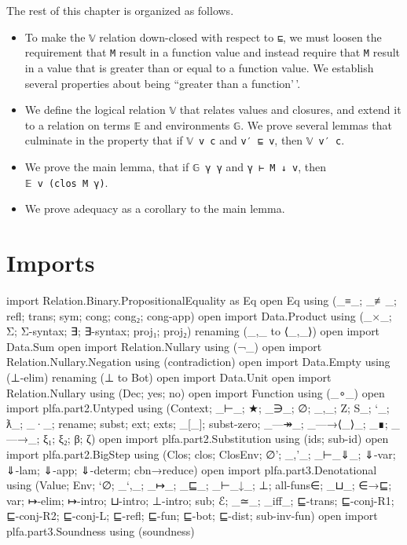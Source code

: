 The rest of this chapter is organized as follows.

\begin{itemize}
\item
  To make the \texttt{𝕍} relation down-closed with respect to
  \texttt{⊑}, we must loosen the requirement that \texttt{M} result in a
  function value and instead require that \texttt{M} result in a value
  that is greater than or equal to a function value. We establish
  several properties about being ``greater than a function'\,'.
\item
  We define the logical relation \texttt{𝕍} that relates values and
  closures, and extend it to a relation on terms \texttt{𝔼} and
  environments \texttt{𝔾}. We prove several lemmas that culminate in the
  property that if \texttt{𝕍\ v\ c} and \texttt{v′\ ⊑\ v}, then
  \texttt{𝕍\ v′\ c}.
\item
  We prove the main lemma, that if \texttt{𝔾\ γ\ γ\textquotesingle{}}
  and \texttt{γ\ ⊢\ M\ ↓\ v}, then
  \texttt{𝔼\ v\ (clos\ M\ γ\textquotesingle{})}.
\item
  We prove adequacy as a corollary to the main lemma.
\end{itemize}

\hypertarget{imports}{%
\section{Imports}\label{imports}}

\begin{fence}
\begin{code}
import Relation.Binary.PropositionalEquality as Eq
open Eq using (_≡_; _≢_; refl; trans; sym; cong; cong₂; cong-app)
open import Data.Product using (_×_; Σ; Σ-syntax; ∃; ∃-syntax; proj₁; proj₂)
  renaming (_,_ to ⟨_,_⟩)
open import Data.Sum
open import Relation.Nullary using (¬_)
open import Relation.Nullary.Negation using (contradiction)
open import Data.Empty using (⊥-elim) renaming (⊥ to Bot)
open import Data.Unit
open import Relation.Nullary using (Dec; yes; no)
open import Function using (_∘_)
open import plfa.part2.Untyped
     using (Context; _⊢_; ★; _∋_; ∅; _,_; Z; S_; `_; ƛ_; _·_;
            rename; subst; ext; exts; _[_]; subst-zero;
            _—↠_; _—→⟨_⟩_; _∎; _—→_; ξ₁; ξ₂; β; ζ)
open import plfa.part2.Substitution using (ids; sub-id)
open import plfa.part2.BigStep
     using (Clos; clos; ClosEnv; ∅'; _,'_; _⊢_⇓_; ⇓-var; ⇓-lam; ⇓-app; ⇓-determ;
            cbn→reduce)
open import plfa.part3.Denotational
     using (Value; Env; `∅; _`,_; _↦_; _⊑_; _⊢_↓_; ⊥; all-funs∈; _⊔_; ∈→⊑;
            var; ↦-elim; ↦-intro; ⊔-intro; ⊥-intro; sub; ℰ; _≃_; _iff_;
            ⊑-trans; ⊑-conj-R1; ⊑-conj-R2; ⊑-conj-L; ⊑-refl; ⊑-fun; ⊑-bot; ⊑-dist;
            sub-inv-fun)
open import plfa.part3.Soundness using (soundness)

\end{code}
\end{fence}

